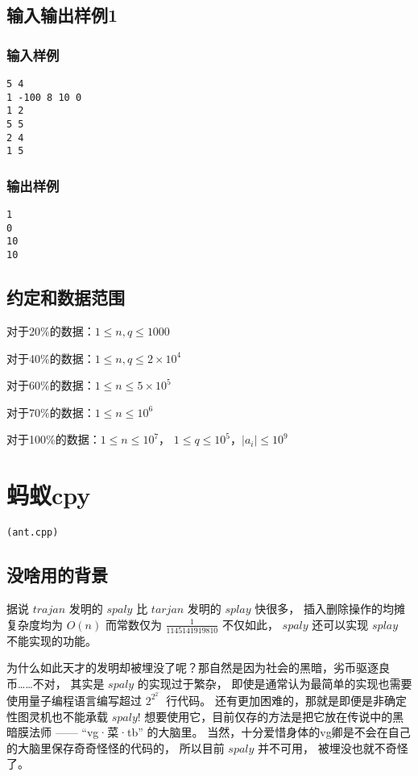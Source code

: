 \documentclass[UTF8]{ctexart}
\begin{document}
\subsection{输入输出样例1}

\subsubsection{输入样例}

\begin{lstlisting}
5 4
1 -100 8 10 0
1 2
5 5
2 4
1 5
\end{lstlisting}

\subsubsection{输出样例}

\begin{lstlisting}
1
0
10
10
\end{lstlisting}


\subsection{约定和数据范围}

对于20\%的数据：$1\le n,q \le 1000$

对于40\%的数据：$1\le n,q \le 2\times 10^4$

对于60\%的数据：$1\le n \le 5\times 10^5$

对于70\%的数据：$1\le n \le 10^6$

对于100\%的数据：$1 \le n \le 10^7$， $1\le q\le 10^5$，$|a_i| \le 10^9$

\newpage
\section{蚂蚁cpy}
\begin{center}
\tt\large{(ant.cpp)}
\end{center}

\subsection{没啥用的背景}

据说 $trajan$ 发明的 $spaly$ 比 $tarjan$ 发明的 $splay$ 快很多， 插入删除操作的均摊复杂度均为 $O(n)$ 而常数仅为 $\frac{1}{1145141919810}$ 不仅如此， $spaly$ 还可以实现 $splay$ 不能实现的功能。

为什么如此天才的发明却被埋没了呢？那自然是因为社会的黑暗，劣币驱逐良币……不对， 其实是 $spaly$ 的实现过于繁杂， 即使是通常认为最简单的实现也需要使用量子编程语言编写超过 $2^{2^{2^{\cdots}}}$ 行代码。 还有更加困难的，那就是即便是非确定性图灵机也不能承载 $spaly$! 想要使用它，目前仅存的方法是把它放在传说中的黑暗膜法师 —— “vg·菜·tb” 的大脑里。 当然，十分爱惜身体的vg卿是不会在自己的大脑里保存奇奇怪怪的代码的， 所以目前 $spaly$ 并不可用， 被埋没也就不奇怪了。
\end{document}
